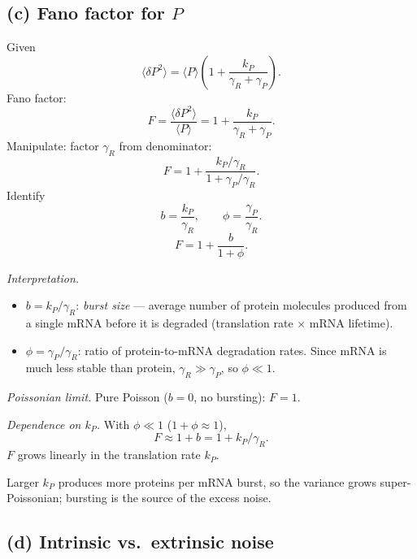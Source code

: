 \documentclass[11pt]{article}
\begin{document}
\subsection*{(c) Fano factor for $P$}

Given
\[ \langle\delta P^2\rangle = \langle P\rangle\!\left(1 + \frac{k_P}{\gamma_R+\gamma_P}\right). \]
Fano factor:
\[ F = \frac{\langle\delta P^2\rangle}{\langle P\rangle} = 1 + \frac{k_P}{\gamma_R+\gamma_P}. \]
Manipulate: factor $\gamma_R$ from denominator:
\[ F = 1 + \frac{k_P/\gamma_R}{1 + \gamma_P/\gamma_R}. \]
Identify
\[ b = \frac{k_P}{\gamma_R},\qquad \phi = \frac{\gamma_P}{\gamma_R}. \]
\[ \boxed{\;F = 1 + \frac{b}{1+\phi}.\;} \]

\textit{Interpretation.}
\begin{itemize}
\item $b = k_P/\gamma_R$: \emph{burst size} --- average number of protein molecules produced from a single mRNA before it is degraded (translation rate $\times$ mRNA lifetime).
\item $\phi = \gamma_P/\gamma_R$: ratio of protein-to-mRNA degradation rates. Since mRNA is much less stable than protein, $\gamma_R \gg \gamma_P$, so $\phi\ll 1$.
\end{itemize}
\textit{Poissonian limit.} Pure Poisson ($b=0$, no bursting): $F=1$.

\textit{Dependence on $k_P$.} With $\phi\ll 1$ ($1+\phi\approx 1$),
\[ F \approx 1 + b = 1 + k_P/\gamma_R. \]
$F$ grows linearly in the translation rate $k_P$.

\begin{center}
\end{center}

Larger $k_P$ produces more proteins per mRNA burst, so the variance grows super-Poissonian; bursting is the source of the excess noise.

\subsection*{(d) Intrinsic vs.\ extrinsic noise}
\end{document}
